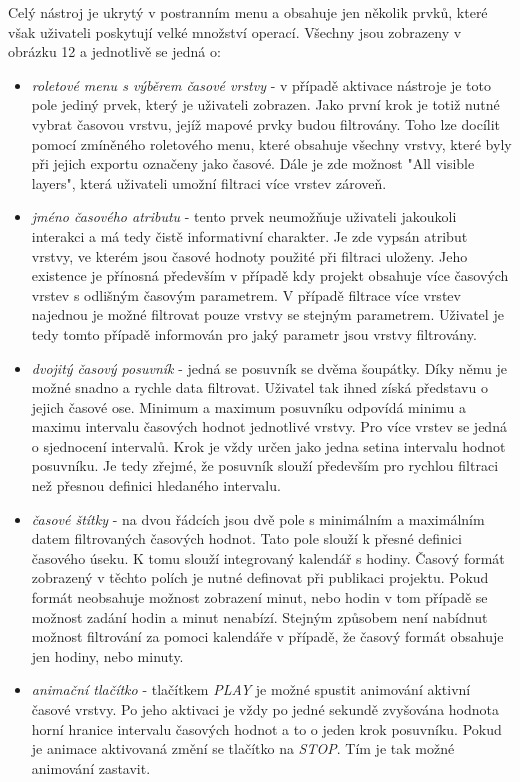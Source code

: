 Celý nástroj je ukrytý v postranním menu a obsahuje jen několik prvků, které však uživateli poskytují velké množství operací. Všechny jsou zobrazeny v obrázku 12 a jednotlivě se jedná o:

\begin{itemize}
	\item\textit{roletové menu s výběrem časové vrstvy} - v případě aktivace nástroje je toto pole jediný prvek, který je uživateli zobrazen. Jako první krok je totiž nutné vybrat časovou vrstvu, jejíž mapové prvky budou filtrovány. Toho lze docílit pomocí zmíněného roletového menu, které obsahuje všechny vrstvy, které byly při jejich exportu označeny jako časové. Dále je zde možnost "All visible layers", která uživateli umožní filtraci více vrstev zároveň.
	\item\textit{jméno časového atributu} - tento prvek neumožňuje uživateli jakoukoli interakci a má tedy čistě informativní charakter. Je zde vypsán atribut vrstvy, ve kterém jsou časové hodnoty použité při filtraci uloženy. Jeho existence je přínosná především v případě kdy projekt obsahuje více časových vrstev s odlišným časovým parametrem. V případě filtrace více vrstev najednou je možné filtrovat pouze vrstvy se stejným parametrem. Uživatel je tedy tomto případě informován pro jaký parametr jsou vrstvy filtrovány.
	\item\textit{dvojitý časový posuvník} - jedná se posuvník se dvěma šoupátky. Díky němu je možné snadno a rychle data filtrovat. Uživatel tak ihned získá představu o jejich časové ose. Minimum a maximum posuvníku odpovídá minimu a maximu intervalu časových hodnot jednotlivé vrstvy. Pro více vrstev se jedná o sjednocení intervalů. Krok je vždy určen jako jedna setina intervalu hodnot posuvníku. Je tedy zřejmé, že posuvník slouží především pro rychlou filtraci než přesnou definici hledaného intervalu. 
	\item\textit{časové štítky} - na dvou řádcích jsou dvě pole s minimálním a maximálním datem filtrovaných časových hodnot. Tato pole slouží k přesné definici časového úseku. K tomu slouží integrovaný kalendář s hodiny. Časový formát zobrazený v těchto polích je nutné definovat při publikaci projektu. Pokud formát neobsahuje možnost zobrazení minut, nebo hodin v tom případě se možnost zadání hodin a minut nenabízí. Stejným způsobem není nabídnut možnost filtrování za pomoci kalendáře v případě, že časový formát obsahuje jen hodiny, nebo minuty.
	\item\textit{animační tlačítko} - tlačítkem \textit{PLAY} je možné spustit animování aktivní časové vrstvy. Po jeho aktivaci je vždy po jedné sekundě zvyšována hodnota horní hranice intervalu časových hodnot a to o jeden krok posuvníku. Pokud je animace aktivovaná změní se tlačítko na \textit{STOP}. Tím je tak možné animování zastavit.
\end{itemize}

